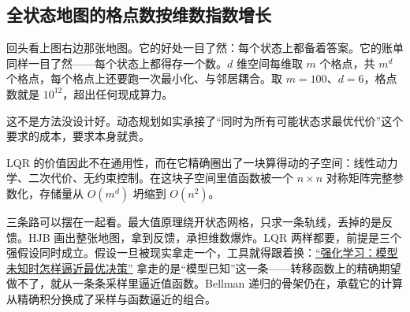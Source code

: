 \subsection{全状态地图的格点数按维数指数增长}

回头看上图右边那张地图。它的好处一目了然：每个状态上都备着答案。它的账单同样一目了然——每个状态上都得存一个数。\(d\) 维空间每维取 \(m\) 个格点，共 \(m^d\) 个格点，每个格点上还要跑一次最小化、与邻居耦合。取 \(m=100\)、\(d=6\)，格点数就是 \(10^{12}\)，超出任何现成算力。

这不是方法没设计好。动态规划如实承接了``同时为所有可能状态求最优代价''这个要求的成本，要求本身就贵。

LQR 的价值因此不在通用性，而在它精确圈出了一块算得动的子空间：线性动力学、二次代价、无约束控制。在这块子空间里值函数被一个 \(n\times n\) 对称矩阵完整参数化，存储量从 \(O(m^d)\) 坍缩到 \(O(n^2)\)。

三条路可以摆在一起看。最大值原理绕开状态网格，只求一条轨线，丢掉的是反馈。HJB 画出整张地图，拿到反馈，承担维数爆炸。LQR 两样都要，前提是三个强假设同时成立。假设一旦被现实拿走一个，工具就得跟着换：\hyperref[ch:139]{``强化学习：模型未知时怎样逼近最优决策''} 拿走的是``模型已知''这一条——转移函数上的精确期望做不了，就从一条条采样里逼近值函数。Bellman 递归的骨架仍在，承载它的计算从精确积分换成了采样与函数逼近的组合。
